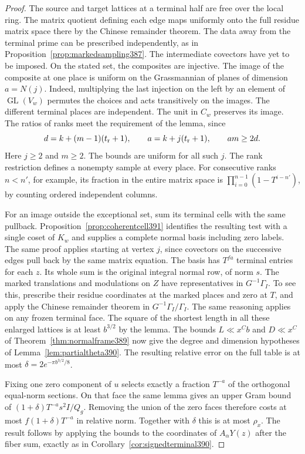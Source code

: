 \documentclass[a4paper,11pt]{article}
\theoremstyle{definition}
\theoremstyle{remark}
\numberwithin{equation}{section}
\begin{document}
\begin{proof}
The source and target lattices at a terminal half are free
over the local ring. The matrix quotient defining each edge
maps uniformly onto the full residue matrix space there by
the Chinese remainder theorem. The data away from the
terminal prime can be prescribed independently, as in
Proposition~\ref{prop:markedsampling387}. The intermediate
covectors have yet to be imposed. On the stated set,
the composites are injective. The image of the composite
at one place is uniform on the Grassmannian of planes of
dimension \(a=N(j)\). Indeed, multiplying the last injection
on the left by an element of \(\operatorname{GL}(V_w)\)
permutes the choices and acts transitively on the images.
The different terminal places are independent. The unit
in \(C_w\) preserves its image. The ratios of ranks meet the
requirement of the lemma, since
\[
       d=k+(m-1)(t_{\rm r}+1),\qquad
       a=k+j(t_{\rm r}+1),\qquad am\ge2d .
\]
Here \(j\ge2\) and \(m\ge2\). The bounds are uniform for all
such \(j\). The rank restriction defines a nonempty sample
at every place. For consecutive ranks \(n<n'\), for example,
its fraction in the entire matrix space is
\(\prod_{i=0}^{n-1}(1-T^{i-n'})\), by counting ordered
independent columns.

For an image outside the exceptional set, sum its terminal
cells with the same pullback. Proposition~\ref{prop:coherentcell391}
identifies the resulting test with a single coset of \(K_w\)
and supplies a complete normal basis including zero labels.
The same proof applies starting at vertex \(j\), since
covectors on the successive edges pull back by the same
matrix equation. The basis has \(T^{fa}\) terminal entries
for each \(z\). Its whole sum is the original integral
normal row, of norm \(s\). The marked translations and
modulations on \(Z\) have representatives in
\(G^{-1}\Gamma_I\). To see this, prescribe their residue
coordinates at the marked places and zero at \(T\), and
apply the Chinese remainder theorem in \(G^{-1}\Gamma_I/\Gamma_I\).
The same reasoning applies on any frozen terminal face.
The square of the shortest length in all these enlarged
lattices is at least \(b^{3/2}\) by the lemma.
The bounds \(L\ll x^{C}b\) and \(D\ll x^{C}\) of
Theorem~\ref{thm:normalframe389} now give the degree and
dimension hypotheses of Lemma~\ref{lem:partialtheta390}.
The resulting relative error on the full table is at most
\(\delta=2e^{-\pi b^{3/2}/8}\).

Fixing one zero component of \(u\) selects exactly a fraction
\(T^{-a}\) of the orthogonal equal-norm sections. On that face
the same lemma gives an upper Gram bound of
\((1+\delta)T^{-a}s^2 I/Q_g\). Removing the union of the
zero faces therefore costs at most \(f(1+\delta)T^{-a}\)
in relative norm. Together with \(\delta\) this is at most
\(\rho_x\). The result follows by applying the bounds to the
coordinates of \(A_\alpha Y(z)\) after the fiber sum, exactly
as in Corollary~\ref{cor:signedterminal390}.
\end{proof}
\end{document}
